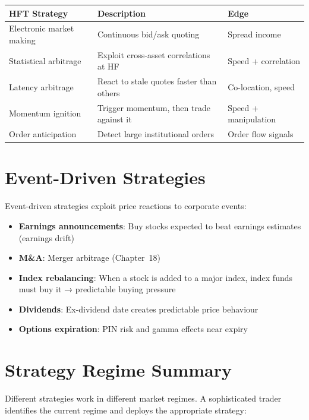 \documentclass[12pt,a4paper,openany]{report}
\theoremstyle{definition}
\begin{document}
\begin{center}
\begin{tabular}{lll}
\toprule
\textbf{HFT Strategy} & \textbf{Description} & \textbf{Edge} \\
\midrule
Electronic market making & Continuous bid/ask quoting & Spread income \\
Statistical arbitrage & Exploit cross-asset correlations at HF & Speed + correlation \\
Latency arbitrage & React to stale quotes faster than others & Co-location, speed \\
Momentum ignition & Trigger momentum, then trade against it & Speed + manipulation \\
Order anticipation & Detect large institutional orders & Order flow signals \\
\bottomrule
\end{tabular}
\end{center}

\section{Event-Driven Strategies}

Event-driven strategies exploit price reactions to corporate events:
\begin{itemize}
  \item \textbf{Earnings announcements}: Buy stocks expected to beat earnings estimates (earnings drift)
  \item \textbf{M\&A}: Merger arbitrage (Chapter~18)
  \item \textbf{Index rebalancing}: When a stock is added to a major index, index funds must buy it → predictable buying pressure
  \item \textbf{Dividends}: Ex-dividend date creates predictable price behaviour
  \item \textbf{Options expiration}: PIN risk and gamma effects near expiry
\end{itemize}

\section{Strategy Regime Summary}

Different strategies work in different market regimes. A sophisticated trader identifies the current regime and deploys the appropriate strategy:
\end{document}
